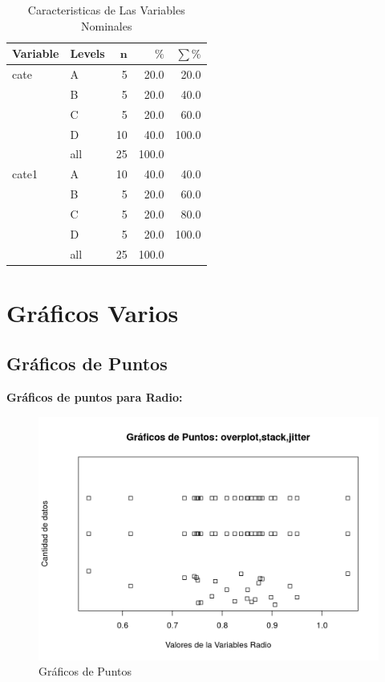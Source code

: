 \documentclass[12pt,a4paper,]{book}
\numberwithin{dummy}{section}
\theoremstyle{ocrenumbox}
\theoremstyle{ocrenumbox}
\theoremstyle{ocrenumbox}
\theoremstyle{ocrenumbox}
\theoremstyle{ocrenum}
\begin{document}
\begin{table}[ht]
\centering
\begingroup\scriptsize
\begin{tabular}{llrrr}
\textbf{Variable} & \textbf{Levels} & $\mathbf{n}$ & $\mathbf{\%}$ & $\mathbf{\sum \%}$ \\
\hline
cate & A & 5 & 20.0 & 20.0 \\
& B & 5 & 20.0 & 40.0 \\
& C & 5 & 20.0 & 60.0 \\
& D & 10 & 40.0 & 100.0 \\
\hline
& all & 25 & 100.0 & \\
\hline
\hline
cate1 & A & 10 & 40.0 & 40.0 \\
& B & 5 & 20.0 & 60.0 \\
& C & 5 & 20.0 & 80.0 \\
& D & 5 & 20.0 & 100.0 \\
\hline
& all & 25 & 100.0 & \\
\hline
\hline
\end{tabular}
\endgroup
\caption{Caracteristicas de Las Variables Nominales}
\label{tab:nominal1}
\end{table}

\hypertarget{gruxe1ficos-varios}{%
\section{Gráficos Varios}\label{gruxe1ficos-varios}}

\hypertarget{gruxe1ficos-de-puntos}{%
\subsection{Gráficos de Puntos}\label{gruxe1ficos-de-puntos}}

\textbf{Gráficos de puntos para Radio:}

\begin{figure}[H]

{\centering \includegraphics[width=0.8\linewidth]{figurasR/grafica1a-1} 

}

\caption{Gráficos de Puntos}\label{fig:grafica1a}
\end{figure}
\end{document}
